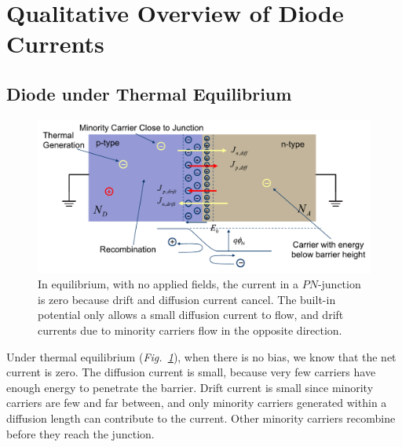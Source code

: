 \section{Qualitative Overview of Diode Currents}
\subsection{Diode under Thermal Equilibrium}
\begin{figure}[t]
\centering
\includegraphics[width=\columnwidth]{slide35}
\caption{In equilibrium, with no applied fields, the current in a $PN$-junction is zero because drift and diffusion current cancel.  The built-in potential only allows a small diffusion current to flow, and drift currents due to minority carriers flow in the opposite direction.}
\label{fig:slide35}
\end{figure}
Under thermal equilibrium (\emph{Fig.~\ref{fig:slide35}}), when there is no bias, we know that the net current is zero.  The diffusion current is small, because very few carriers have enough energy to penetrate the barrier.  Drift current is small since minority carriers are few and far between, and only minority carriers generated within a diffusion length can contribute to the current.  Other minority carriers recombine before they reach the junction.
